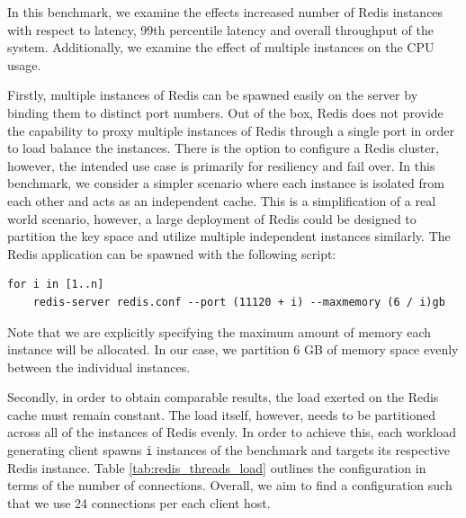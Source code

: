 In this benchmark, we examine the effects increased number of Redis instances with respect to latency, 99th percentile latency and overall throughput of the system. Additionally, we examine the effect of multiple instances on the CPU usage.

Firstly, multiple instances of Redis can be spawned easily on the server by binding them to distinct port numbers. Out of the box, Redis does not provide the capability to proxy multiple instances of Redis through a single port in order to load balance the instances. There is the option to configure a Redis cluster, however, the intended use case is primarily for resiliency and fail over. In this benchmark, we consider a simpler scenario where each instance is isolated from each other and acts as an independent cache. This is a simplification of a real world scenario, however, a large deployment of Redis could be designed to partition the key space and utilize multiple independent instances similarly. The Redis application can be spawned with the following script:

\begin{lstlisting}
for i in [1..n]
    redis-server redis.conf --port (11120 + i) --maxmemory (6 / i)gb
\end{lstlisting}

Note that we are explicitly specifying the maximum amount of memory each instance will be allocated. In our case, we partition 6 GB of memory space evenly between the individual instances.

Secondly, in order to obtain comparable results, the load exerted on the Redis cache must remain constant. The load itself, however, needs to be partitioned across all of the instances of Redis evenly. In order to achieve this, each workload generating client spawns \texttt{i} instances of the benchmark and targets its respective Redis instance. Table \ref{tab:redis_threads_load} outlines the configuration in terms of the number of connections. Overall, we aim to find a configuration such that we use 24 connections per each client host.

